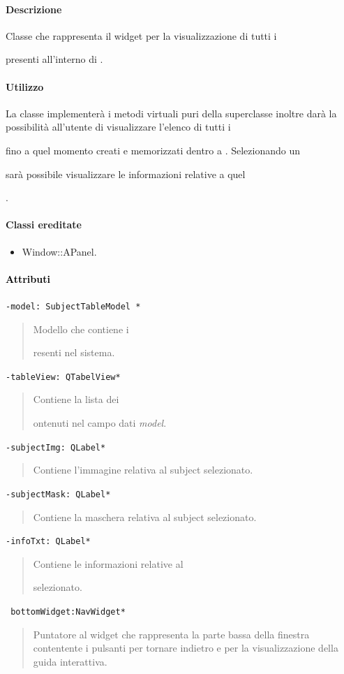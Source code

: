 \paragraph{Descrizione \\}
Classe che rappresenta il widget per la visualizzazione di tutti i \subject{} presenti all'interno di \project.
\paragraph{Utilizzo\\}
La classe implementerà i metodi virtuali puri della superclasse inoltre darà la possibilità all'utente di visualizzare l'elenco di tutti i \subject{} fino a quel momento creati e memorizzati dentro a \project. Selezionando un \subject{} sarà possibile visualizzare le informazioni relative a quel \subject{}.
\paragraph{Classi ereditate\\}
\begin{itemize}
\item Window::APanel.
\end{itemize}
\paragraph{\textcolor{black}{Attributi\\}}
\color{teal}\verb!-model: SubjectTableModel *!
\begin{quote}
\color{black}Modello che contiene i \subject presenti nel sistema.
\end{quote}
\color{teal}\verb!-tableView: QTabelView*!
\color{black}
\begin{quote}
Contiene la lista dei \subject contenuti nel campo dati \emph{model}.
\end{quote}
\color{teal}\verb!-subjectImg: QLabel*!
\color{black}
\begin{quote}
Contiene l'immagine relativa al subject\g{} selezionato.
\end{quote}
\color{teal}\verb!-subjectMask: QLabel*!
\begin{quote}
\color{black}
Contiene la maschera relativa al subject\g{} selezionato.
\end{quote}
\color{teal}\verb!-infoTxt: QLabel*!
\begin{quote}
\color{black}
Contiene le informazioni relative al \subject{} selezionato.
\end{quote}
\color{teal}\verb! bottomWidget:NavWidget*!
\color{black} 
\begin{quote}
Puntatore al widget che rappresenta la parte bassa della finestra contentente i pulsanti per tornare indietro e per la visualizzazione della guida interattiva.
\end{quote}
